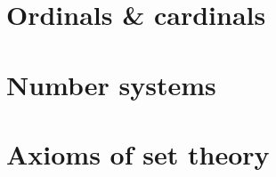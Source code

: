 \documentclass[a4paper,nobib,nols]{tufte-book}
\begin{document}
\section{Ordinals \& cardinals}%
\label{sec:ordinals_cardinals}

\section{Number systems}%
\label{sec:number_systems}

\section{Axioms of set theory}%
\label{sec:axioms_of_set_theory}

\backmatter


\printbibliography[keyword=alph]
\printbibliography[heading=none, notkeyword=alph]
\end{document}
